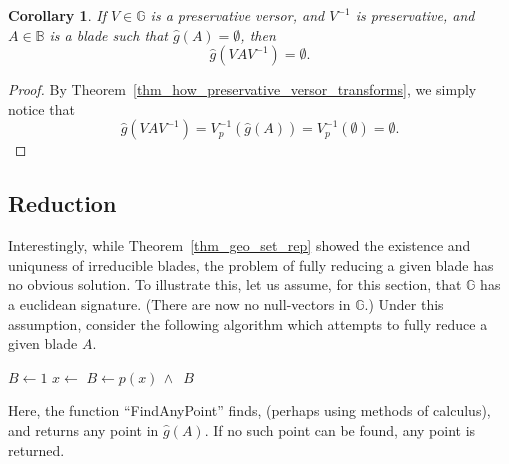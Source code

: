 \documentclass{birkjour}
\newtheorem{cor}[thm]{Corollary}
\newtheorem{lem}[thm]{Lemma}
\theoremstyle{definition}
\theoremstyle{remark}
\numberwithin{equation}{section}
\newcommand{\R}{\mathbb{R}}
\newcommand{\B}{\mathbb{B}}
\newcommand{\G}{\mathbb{G}}
\newcommand{\gh}{\hat{g}}
\begin{document}
\begin{cor}
If $V\in\G$ is a preservative versor, and $V^{-1}$ is preservative,
and $A\in\B$ is a blade such that $\gh(A)=\emptyset$, then
\begin{equation}
\gh(VAV^{-1})=\emptyset.
\end{equation}
\end{cor}
\begin{proof}
By Theorem~\ref{thm_how_preservative_versor_transforms}, we simply notice that
\begin{equation}
\gh(VAV^{-1})=V_p^{-1}(\gh(A))=V_p^{-1}(\emptyset)=\emptyset.
\end{equation}
\end{proof}


\subsection{Reduction}

Interestingly, while Theorem~\ref{thm_geo_set_rep} showed the existence and uniquness of irreducible blades,
the problem of fully reducing a given blade has no obvious solution.  To illustrate this, let us assume, for this section,
that $\G$ has a euclidean signature.
(There are now no null-vectors in $\G$.)  Under this assumption, consider the following algorithm which
attempts to fully reduce a given blade $A$.

\begin{algorithmic}
	\State $B\gets 1$
	\State $x\gets$
		\State $B\gets p(x)\,\wedge\,$
	\EndIf
	\State\Return $B$
\EndFunction
\end{algorithmic}
Here, the function ``FindAnyPoint'' finds, (perhaps using methods of calculus), and returns any point in $\gh(A)$.
If no such point can be found, any point is returned.
\end{document}
